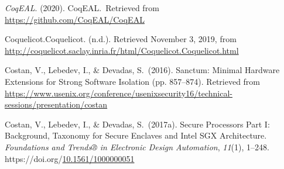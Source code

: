 \documentclass[12pt,twoside]{article}
\begin{document}
{\begin{thebibliography}{1079}
\mdbibitemlabel{}\emph{CoqEAL}. (2020). CoqEAL.~Retrieved from \href{https://github.com/CoqEAL/CoqEAL}{{\ttfamily https://\hspace{0pt}github.\hspace{0pt}com/\hspace{0pt}CoqEAL/\hspace{0pt}CoqEAL}}%

\mdbibitemlabel{}Coquelicot.Coquelicot. (n.d.). Retrieved November 3, 2019, from \href{http://coquelicot.saclay.inria.fr/html/Coquelicot.Coquelicot.html}{{\ttfamily http://\hspace{0pt}coquelicot.\hspace{0pt}saclay.\hspace{0pt}inria.\hspace{0pt}fr/\hspace{0pt}html/\hspace{0pt}Coquelicot.\hspace{0pt}Coquelicot.\hspace{0pt}html}}%

\mdbibitemlabel{}Costan, V., Lebedev, I., \& Devadas, S.~(2016). Sanctum: Minimal Hardware Extensions for Strong Software Isolation (pp. 857–874). Retrieved from \href{https://www.usenix.org/conference/usenixsecurity16/technical-sessions/presentation/costan}{{\ttfamily https://\hspace{0pt}www.\hspace{0pt}usenix.\hspace{0pt}org/\hspace{0pt}conference/\hspace{0pt}usenixsecurity16/\hspace{0pt}technical-\hspace{0pt}sessions/\hspace{0pt}presentation/\hspace{0pt}costan}}%

\mdbibitemlabel{}Costan, V., Lebedev, I., \& Devadas, S.~(2017a). Secure Processors Part I: Background, Taxonomy for Secure Enclaves and Intel SGX Architecture. \emph{Foundations and Trends® in Electronic Design Automation}, \emph{11}(1), 1–248. https://doi.org/\href{https://dx.doi.org/10.1561/1000000051}{10.1561/1000000051}%


\end{thebibliography}}
\end{document}
